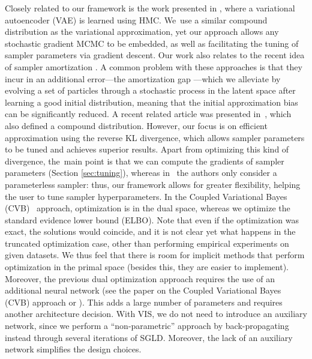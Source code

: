 {Closely related to our framework is the work presented in \parencite{hoffman2017learning}, where a variational autoencoder (VAE) is learned using HMC. We~use a similar compound distribution as the variational approximation, yet 
our approach allows  any stochastic gradient MCMC to be embedded, %
 as well as facilitating the tuning of sampler parameters via gradient descent.
Our work also relates to the recent idea of 
sampler amortization \parencite{feng2017learning}. 
A common problem with these approaches is that they incur in an additional error---the amortization gap \parencite{cremer2018inference}---which we alleviate by evolving a set of particles through a stochastic process in the latent space after learning a good initial distribution,
meaning that %
the initial approximation bias can be significantly reduced.
A recent related article was presented in~\parencite{pmlr-v97-ruiz19a},
which also defined a compound distribution. 
However, our focus is on efficient approximation using the reverse KL %
divergence, %
which allows sampler parameters to be tuned and achieves superior results. Apart from optimizing this kind of divergence, %
the~main point is that we can compute the gradients of sampler parameters %
(Section \ref{sec:tuning}), whereas in~\parencite{pmlr-v97-ruiz19a} the authors only consider a parameterless sampler: %
thus, our framework allows for greater flexibility, helping the user
to tune sampler hyperparameters.
In the Coupled Variational Bayes (CVB)~\parencite{dai2018coupled} approach,
optimization is in the dual space, whereas
we optimize the standard
evidence lower bound (ELBO). Note that even if the optimization was exact, the solutions would coincide, and it is not clear yet what happens in the truncated optimization case,%
other than performing empirical experiments on given datasets. We thus feel that there is room for implicit methods that perform optimization in the primal space 
(besides this, they are easier to implement). Moreover,
the previous dual optimization approach requires the use of an additional neural network (see the paper on the Coupled Variational Bayes (CVB) approach
 or \parencite{fang2019implicit}). This adds a large number of parameters and requires another architecture decision. With VIS, we do not need to introduce an auxiliary network, since we perform a ``non-parametric'' approach by back-propagating instead through 
several iterations of SGLD. %
Moreover, the lack of an auxiliary network simplifies the design choices.
}


